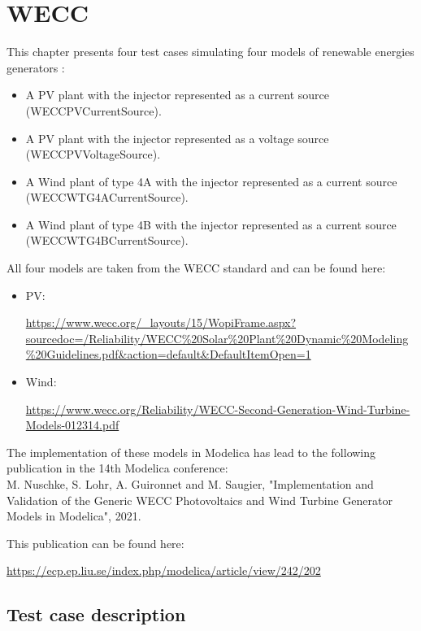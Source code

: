 \documentclass[a4paper, 12pt]{report}
\begin{document}
\chapter{WECC}

This chapter presents four test cases simulating four models of renewable energies generators :
\begin{itemize}
\item A PV plant with the injector represented as a current source (WECCPVCurrentSource).
\item A PV plant with the injector represented as a voltage source (WECCPVVoltageSource).
\item A Wind plant of type 4A with the injector represented as a current source (WECCWTG4ACurrentSource).
\item A Wind plant of type 4B with the injector represented as a current source (WECCWTG4BCurrentSource).
\end{itemize}

All four models are taken from the WECC standard and can be found here:
\begin{itemize}
\item PV:

\url{https://www.wecc.org/\_layouts/15/WopiFrame.aspx?sourcedoc=/Reliability/WECC\%20Solar\%20Plant\%20Dynamic\%20Modeling\%20Guidelines.pdf\&action=default\&DefaultItemOpen=1}

\item Wind:

\url{https://www.wecc.org/Reliability/WECC-Second-Generation-Wind-Turbine-Models-012314.pdf}
\end{itemize}

The implementation of these models in Modelica has lead to the following publication in the 14th Modelica conference:\\

M. Nuschke, S. Lohr, A. Guironnet and M. Saugier, "Implementation and Validation of the Generic WECC Photovoltaics and Wind Turbine Generator Models in Modelica", 2021.\\

\par This publication can be found here:

\url{https://ecp.ep.liu.se/index.php/modelica/article/view/242/202}

\section{Test case description}
\end{document}
